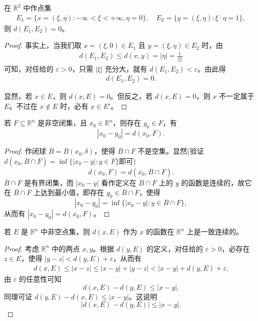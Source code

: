 \documentclass[../../main.tex]{subfiles}%
\begin{document}
\begin{example}
在 \(\mathbb{R}^2\) 中作点集
\begin{align*}
E_1 = \{x = (\xi,\eta): -\infty < \xi < +\infty, \eta = 0\},\quad
E_2 = \{y = (\xi,\eta): \xi\cdot\eta = 1\},
\end{align*}
则 \(d(E_1,E_2) = 0\)。
\end{example}
\begin{proof}

事实上，当我们取 \(x = (\xi,0)\in E_1\) 且 \(y = (\xi,\eta)\in E_2\) 时，由
\begin{align*}
d(E_1,E_2) \leqslant d(x,y) = |\eta| = \frac{1}{|\xi|}
\end{align*}
可知，对任给的 \(\varepsilon > 0\)，只需 \(|\xi|\) 充分大，就有 \(d(E_1,E_2) < \varepsilon\)。由此得
\begin{align*}
d(E_1,E_2) = 0.
\end{align*}

显然，若 \(x\in E\)，则 \(d(x,E) = 0\)。但反之，若 \(d(x,E) = 0\)，则 \(x\) 不一定属于 \(E\)。不过在 \(x\notin E\) 时，必有 \(x\in E'\)。 
\end{proof}

\begin{theorem}\label{theorem:非空闭集关于点集之间距离的基本定理}
若 \(F\subseteq\mathbb{R}^n\) 是非空闭集，且 \(x_0\in\mathbb{R}^n\)，则存在 \(y_0\in F\)，有
\[
|x_0 - y_0| = d(x_0,F).
\]
\end{theorem}
\begin{proof}
作闭球 \(\overline{B}=\overline{B}(x_0,\delta)\)，使得 \(\overline{B}\cap F\) 不是空集。显然(验证$d(x_0,\overline{B}\cap F)=\inf\{|x_0-y|:y\in F\}$即可)
\[
d(x_0,F)=d(x_0,\overline{B}\cap F).
\]
\(\overline{B}\cap F\) 是有界闭集，而 \(|x_0 - y|\) 看作定义在 \(\overline{B}\cap F\) 上的 \(y\) 的函数是连续的，故它在 \(\overline{B}\cap F\) 上达到最小值，即存在 \(y_0\in\overline{B}\cap F\)，使得
\[
|x_0 - y_0| = \inf\{|x_0 - y|: y\in\overline{B}\cap F\},
\]
从而有 \(|x_0 - y_0| = d(x_0,F)\)。
\end{proof}

\begin{theorem}\label{theorem:距离函数都是一致连续的}
若 \(E\) 是 \(\mathbb{R}^n\) 中非空点集，则 \(d(x,E)\) 作为 \(x\) 的函数在 \(\mathbb{R}^n\) 上是一致连续的。
\end{theorem}
\begin{proof}
考虑 \(\mathbb{R}^n\) 中的两点 \(x,y\)。根据 \(d(y,E)\) 的定义，对任给的 \(\varepsilon>0\)，必存在 \(z\in E\)，使得 \(|y - z|<d(y,E)+\varepsilon\)，从而有
\begin{align*}
d(x,E)\leqslant|x - z|\leqslant|x - y|+|y - z|
<|x - y|+d(y,E)+\varepsilon.
\end{align*}
由 \(\varepsilon\) 的任意性可知
\[
d(x,E)-d(y,E)\leqslant|x - y|.
\]
同理可证 \(d(y,E)-d(x,E)\leqslant|x - y|\)。这说明
\[
|d(x,E)-d(y,E)|\leqslant|x - y|.
\]
\end{proof}
\end{document}
